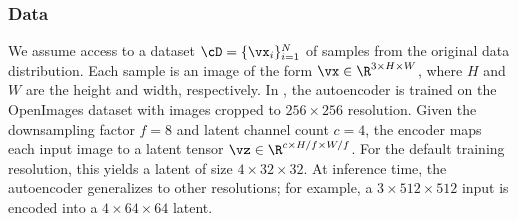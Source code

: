 \documentclass[../../book-main.tex]{subfiles}
\begin{document}
\subsubsection{Data}
We assume access to a dataset \(\cD = \{\vx_i\}_{i=1}^N\) of samples from the original data distribution.
Each sample is an image of the form \(\vx \in \R^{3 \times H \times W}\), where \(H\) and \(W\) are the height and width, respectively.
In \citet{rombach2022high}, the autoencoder is trained on the OpenImages dataset with images cropped to \(256 \times 256\) resolution.
Given the downsampling factor \(f = 8\) and latent channel count \(c = 4\), the encoder maps each input image to a latent tensor \(\vz \in \R^{c \times H/f \times W/f}\).
For the default training resolution, this yields a latent of size \(4 \times 32 \times 32\).
At inference time, the autoencoder generalizes to other resolutions; for example, a \(3 \times 512 \times 512\) input is encoded into a \(4 \times 64 \times 64\) latent.
\end{document}
